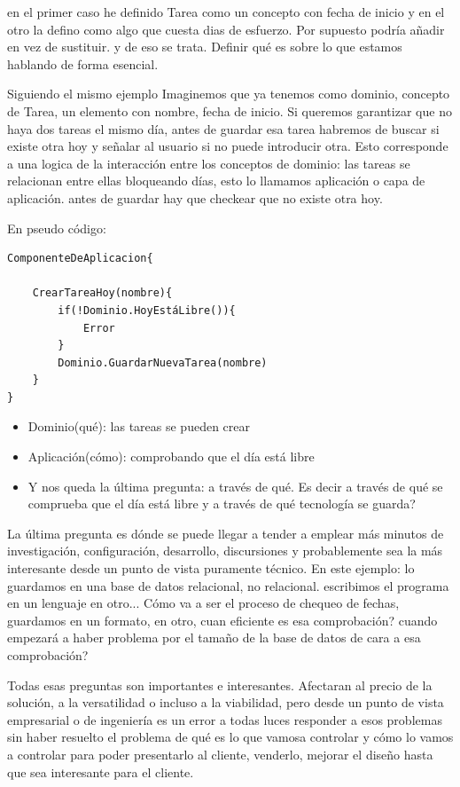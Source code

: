 en el primer caso he definido Tarea como un concepto con fecha de inicio y en el otro la defino como algo que cuesta dias de esfuerzo. Por supuesto podría añadir en vez de sustituir. y de eso se trata. Definir qué es sobre lo que estamos hablando de forma esencial.

Siguiendo el mismo ejemplo Imaginemos que ya tenemos como dominio, concepto de Tarea, un elemento con nombre, fecha de inicio. Si queremos garantizar que no haya dos tareas el mismo día, antes de guardar esa tarea habremos de buscar si existe otra hoy y señalar al usuario si no puede introducir otra. Esto corresponde a una logica de la interacción entre los conceptos de dominio: las tareas se relacionan entre ellas bloqueando días, esto lo llamamos aplicación o capa de aplicación. antes de guardar hay que checkear que no existe otra hoy.

En pseudo código:
\begin{verbatim}
ComponenteDeAplicacion{

    CrearTareaHoy(nombre){
        if(!Dominio.HoyEstáLibre()){
            Error
        }
        Dominio.GuardarNuevaTarea(nombre)
    }
}
\end{verbatim}

\begin{itemize}
    \item Dominio(qué): las tareas se pueden crear
    \item Aplicación(cómo): comprobando que el día está libre
    \item Y  nos queda la última pregunta: a través de qué. Es decir a través de qué se comprueba que el día está libre y a través de qué tecnología se guarda?
\end{itemize}

La última pregunta es dónde se puede llegar a tender a emplear más minutos de investigación, configuración, desarrollo, discursiones y probablemente sea la más interesante desde un punto de vista puramente técnico. En este ejemplo: lo guardamos en una base de datos relacional, no relacional. escribimos el programa en un lenguaje en otro... Cómo va a ser el proceso de chequeo de fechas, guardamos en un formato, en otro, cuan eficiente es esa comprobación? cuando empezará a haber problema por el tamaño de la base de datos de cara a esa comprobación?

Todas esas preguntas son importantes e interesantes. Afectaran al precio de la solución, a la versatilidad o incluso a la viabilidad, pero desde un punto de vista empresarial o de ingeniería es un error a todas luces responder a esos problemas sin haber resuelto el problema de qué es lo que vamosa controlar y cómo lo vamos a controlar para poder presentarlo al cliente, venderlo, mejorar el diseño hasta que sea interesante para el cliente.

